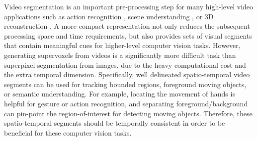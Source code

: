 \documentclass[runningheads]{llncs}
\begin{document}
Video segmentation is an important pre-processing step for many high-level video applications such as action recognition \cite{Taralova2014}, scene understanding \cite{conf/iccv/JainCV13}, or 3D reconstruction \cite{Kundu2014}. A more compact representation not only reduces the subsequent processing space and time requirements, but also provides sets of visual segments that contain meaningful cues for higher-level computer vision tasks. However, generating supervoxels from videos is a significantly more difficult task than superpixel segmentation from images, due to the heavy computational cost and the extra temporal dimension.
Specifically, well delineated spatio-temporal video segments can be used for tracking bounded regions, foreground moving objects, or semantic understanding. For example, locating the movement of hands is helpful for gesture or action recognition, and separating foreground/background can pin-point the region-of-interest for detecting moving objects. Therefore, these spatio-temporal segments should be temporally consistent in order to be beneficial for these computer vision tasks.
\end{document}
